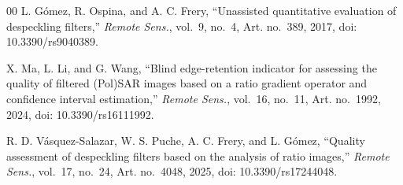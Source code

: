 \documentclass[journal]{IEEEtran}
\begin{document}
\begin{thebibliography}{00}
L. G\'omez, R. Ospina, and A. C. Frery, ``Unassisted quantitative evaluation of despeckling filters,'' \emph{Remote Sens.}, vol.~9, no.~4, Art. no.~389, 2017, doi: 10.3390/rs9040389.

X. Ma, L. Li, and G. Wang, ``Blind edge-retention indicator for assessing the quality of filtered (Pol)SAR images based on a ratio gradient operator and confidence interval estimation,'' \emph{Remote Sens.}, vol.~16, no.~11, Art. no.~1992, 2024, doi: 10.3390/rs16111992.

R. D. V\'asquez-Salazar, W. S. Puche, A. C. Frery, and L. G\'omez, ``Quality assessment of despeckling filters based on the analysis of ratio images,'' \emph{Remote Sens.}, vol.~17, no.~24, Art. no.~4048, 2025, doi: 10.3390/rs17244048.

\end{thebibliography}
\end{document}

